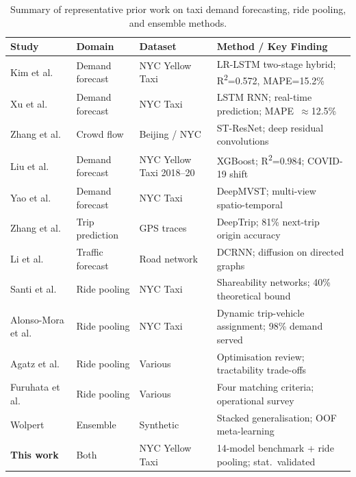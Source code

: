 \documentclass[a4paper,fleqn]{cas-dc}
\begin{document}
\begin{table}[t]
\centering
\caption{Summary of representative prior work on taxi demand forecasting, ride pooling, and ensemble methods.\label{tab:litreview}}
\small
\begin{tabular}{@{}p{2.8cm}p{2.2cm}p{2.4cm}p{5.8cm}@{}}
\toprule
\textbf{Study} & \textbf{Domain} & \textbf{Dataset} & \textbf{Method / Key Finding} \\
\toprule
Kim et al.~\cite{kim2020hybrid} & Demand forecast & NYC Yellow Taxi & LR-LSTM two-stage hybrid; R\textsuperscript{2}=0.572, MAPE=15.2\% \\
Xu et al.~\cite{xu2017realtime} & Demand forecast & NYC Taxi & LSTM RNN; real-time prediction; MAPE~$\approx$12.5\% \\
Zhang et al.~\cite{zhang2017deep} & Crowd flow & Beijing / NYC & ST-ResNet; deep residual convolutions \\
Liu et al.~\cite{liu2021epidemic} & Demand forecast & NYC Yellow Taxi 2018--20 & XGBoost; R\textsuperscript{2}=0.984; COVID-19 shift \\
Yao et al.~\cite{yao2018deeptraffic} & Demand forecast & NYC Taxi & DeepMVST; multi-view spatio-temporal \\
Zhang et al.~\cite{zhang2023deeptrip} & Trip prediction & GPS traces & DeepTrip; 81\% next-trip origin accuracy \\
Li et al.~\cite{li2018diffusion} & Traffic forecast & Road network & DCRNN; diffusion on directed graphs \\
Santi et al.~\cite{santi2014quantifying} & Ride pooling & NYC Taxi & Shareability networks; 40\% theoretical bound \\
Alonso-Mora et al.~\cite{alonso2017demand} & Ride pooling & NYC Taxi & Dynamic trip-vehicle assignment; 98\% demand served \\
Agatz et al.~\cite{agatz2012ridesharing} & Ride pooling & Various & Optimisation review; tractability trade-offs \\
Furuhata et al.~\cite{furuhata2013ridesharing} & Ride pooling & Various & Four matching criteria; operational survey \\
Wolpert~\cite{wolpert1992stacking} & Ensemble & Synthetic & Stacked generalisation; OOF meta-learning \\
\textbf{This work} & Both & NYC Yellow Taxi & 14-model benchmark + ride pooling; stat.\ validated \\
\bottomrule
\end{tabular}
\end{table}
\end{document}
